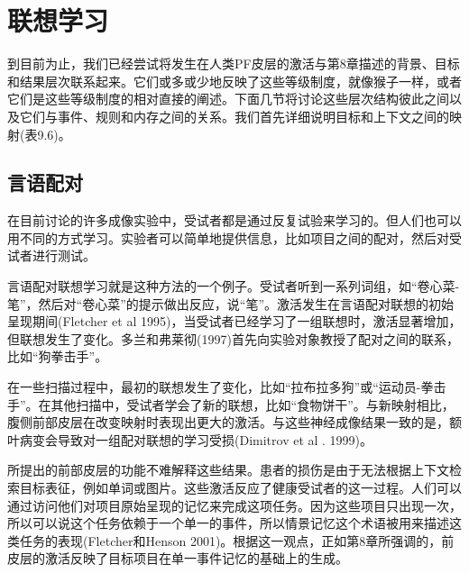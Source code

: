 \section{联想学习}
\par
到目前为止，我们已经尝试将发生在人类PF皮层的激活与第8章描述的背景、目标和结果层次联系起来。它们或多或少地反映了这些等级制度，就像猴子一样，或者它们是这些等级制度的相对直接的阐述。下面几节将讨论这些层次结构彼此之间以及它们与事件、规则和内存之间的关系。我们首先详细说明目标和上下文之间的映射(表9.6)。
\subsection{言语配对}
\par
在目前讨论的许多成像实验中，受试者都是通过反复试验来学习的。但人们也可以用不同的方式学习。实验者可以简单地提供信息，比如项目之间的配对，然后对受试者进行测试。
\par
言语配对联想学习就是这种方法的一个例子。受试者听到一系列词组，如“卷心菜-笔”，然后对“卷心菜”的提示做出反应，说“笔”。激活发生在言语配对联想的初始呈现期间(Fletcher et al 1995)，当受试者已经学习了一组联想时，激活显著增加，但联想发生了变化。多兰和弗莱彻(1997)首先向实验对象教授了配对之间的联系，比如“狗拳击手”。
\par
在一些扫描过程中，最初的联想发生了变化，比如“拉布拉多狗”或“运动员-拳击手”。在其他扫描中，受试者学会了新的联想，比如“食物饼干”。与新映射相比，腹侧前部皮层在改变映射时表现出更大的激活。与这些神经成像结果一致的是，额叶病变会导致对一组配对联想的学习受损(Dimitrov et al . 1999)。
\par
所提出的前部皮层的功能不难解释这些结果。患者的损伤是由于无法根据上下文检索目标表征，例如单词或图片。这些激活反应了健康受试者的这一过程。人们可以通过访问他们对项目原始呈现的记忆来完成这项任务。因为这些项目只出现一次，所以可以说这个任务依赖于一个单一的事件，所以情景记忆这个术语被用来描述这类任务的表现(Fletcher和Henson 2001)。根据这一观点，正如第8章所强调的，前皮层的激活反映了目标项目在单一事件记忆的基础上的生成。
\par
